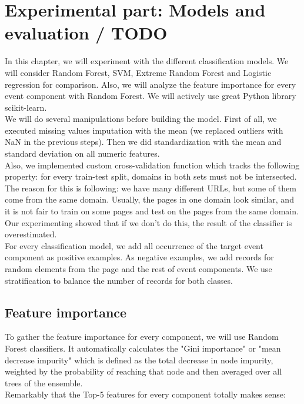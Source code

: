 \chapter{Experimental part: Models and evaluation / TODO}
\label{chap:model}
In this chapter, we will experiment with the different classification models. We will consider Random Forest, SVM, Extreme Random Forest \cite{ExtRF} and Logistic regression for comparison. Also, we will analyze the feature importance for every event component with Random Forest. We will actively use great Python library scikit-learn.\\

We will do several manipulations before building the model. First of all, we executed missing values imputation with the mean (we replaced outliers with NaN in the previous steps). Then we did standardization with the mean and standard deviation on all numeric features. \\

Also, we implemented custom cross-validation function which tracks the following property: for every train-test split, domains in both sets must not be intersected. The reason for this is following: we have many different URLs, but some of them come from the same domain. Usually, the pages in one domain look similar, and it is not fair to train on some pages and test on the pages from the same domain. Our experimenting showed that if we don't do this, the result of the classifier is overestimated. \\

For every classification model, we add all occurrence of the target event component as positive examples. As negative examples, we add records for random elements from the page and the rest of event components. We use stratification to balance the number of records for both classes.

\section{Feature importance}
To gather the feature importance for every component, we will use Random Forest classifiers. It automatically calculates the "Gini importance" or "mean decrease impurity" which is defined as the total decrease in node impurity, weighted by the probability of reaching that node and then averaged over all trees of the ensemble.\\

Remarkably that the Top-5 features for every component totally makes sense:

